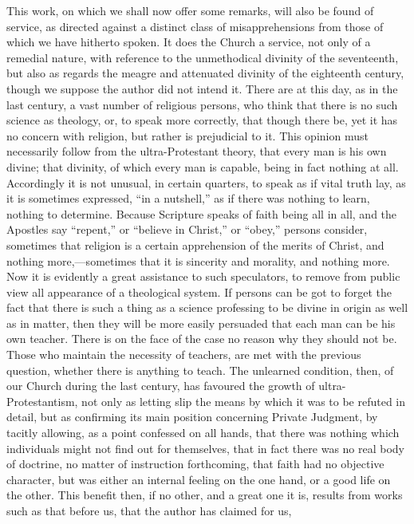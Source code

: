 This work, on which we shall now offer some
remarks, will also be found of service, as directed against a distinct
class of misapprehensions from those of which we have hitherto spoken.
It does the Church a service, not only of a remedial nature, with
reference to the unmethodical divinity of the seventeenth, but also as
regards the meagre and attenuated divinity of the eighteenth century,
though we suppose the author did not intend it. There are at this day,
as in the last century, a vast number of religious persons, who think
that there is no such science as theology, or, to speak more
correctly, that though there be, yet it has no concern with religion,
but rather is prejudicial to it. This opinion must necessarily follow
from the ultra-Protestant theory, that every man is his own divine;
that divinity, of which every man is capable, being in fact nothing at
all. Accordingly it is not unusual, in certain quarters, to speak as
if vital truth lay, as it is sometimes expressed, ``in a nutshell,'' as
if there was nothing to learn, nothing to determine. Because
Scripture speaks of faith being all in all, and the Apostles say ``repent,''
or ``believe in Christ,'' or ``obey,'' persons consider, sometimes that
religion is a certain apprehension of the merits of Christ, and
nothing more,—sometimes that it is sincerity and morality, and
nothing more. Now it is evidently a great assistance to such
speculators, to remove from public view all appearance of a
theological system. If persons can be got to forget the fact that
there is such a thing as a science professing to be divine in origin
as well as in matter, then they will be more easily persuaded that
each man can be his own teacher. There is on the face of the case no
reason why they should not be. Those who maintain the necessity of
teachers, are met with the previous question, whether there is
anything to teach. The unlearned condition, then, of our Church during
the last century, has favoured the growth of ultra-Protestantism, not
only as letting slip the means by which it was to be refuted in
detail, but as confirming its main position concerning Private
Judgment, by tacitly allowing, as a point confessed on all hands, that
there was nothing which individuals might not find out for themselves,
that in fact there was no real body of doctrine, no matter of
instruction forthcoming, that faith had no objective character, but
was either an internal feeling on the one hand, or a good life on the
other. This benefit then, if no other, and a great one it is, results
from works such as that before us, that the author has claimed for us,
